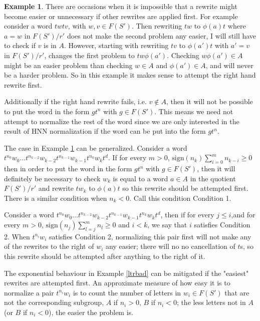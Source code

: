 \documentclass[11pt]{article} %
\theoremstyle{definition}
\theoremstyle{definition}
\theoremstyle{definition}
\theoremstyle{definition}
\theoremstyle{definition}
\theoremstyle{definition}
\newtheorem{exmpl}{Example}[theorem]
\begin{document}
\begin{exmpl}\label{lastfirst}
There are occasions when it is impossible that a rewrite might become
easier or unnecessary if other rewrites are applied first. For example
consider a word $twtv$, with $w, v \in F(S')$. Then rewriting $tw$ to
$\phi(a)t$ where $a = w$ in $F(S') / r'$ does not make the second problem
any easier, I will still have to check if $v$ is in $A$. However,
starting with rewriting $tv$ to $\phi(a')t$ with $a' = v$ in $F(S') / r'$,
changes the first problem to $tw\phi(a')$.
Checking $w\phi(a') \in A$ might be an easier problem than checking $w \in A$
and $\phi(a') \in A$, and will never be a harder problem. So in this example
it makes sense to attempt the right hand rewrite first.

Additionally if the
right hand rewrite fails, i.e. $v \notin A$, then it will not be possible to
put the word in the form $gt^n$ with $g \in F(S')$. This means we need not
attempt to normalize the rest of the word since we are only interested in the result of
HNN normalization if the word can be put into the form $gt^n$.
\end{exmpl}

The case in Example \ref{lastfirst} can be generalized.
Consider a word \newline $t^{n_0}w_0 \dots t^{n_{k-2}}w_{k-2}t^{n_{k-1}}w_{k-1}t^{n_{k}}w_{k}t^d$.
If for every $m > 0$, $\text{sign}(n_k)\sum_{i=0}^m n_{k - i} \ge 0$ then
in order to put the word in the form $gt^n$ with $g \in F(S')$, then it will definitely
be necessary to check $w_k$ is equal to a word  $a \in A$ in the quotient
$F(S') / r'$ and rewrite $tw_k$ to $\phi(a)t$ so this
rewrite should be attempted first.
There is a similar condition when $n_k < 0$. Call this condition Condition 1.

Consider a word
$t^{n_0}w_0 \dots t^{n_{k-2}}w_{k-2}t^{n_{k-1}}w_{k-1}t^{n_{k}}w_{k}t^d$,
then if for every $j \le i$,and for every $m > 0$, $\text{sign}(n_j)\sum_{l=j}^m n_l \ge 0$ and
$i < k$, we say that $i$ satisfies Condition 2.
When $t^{n_i}w_i$ satisfies Condition 2,
normalizing this pair first will not make any of the rewrites to the right
of $w_i$ any easier; there will no no cancellation of $t$s,
so this rewrite should be attempted after anything to the right of it.

The exponential behaviour in Example \ref{ltrbad} can be mitigated if the "easiest"
rewrites are attempted first. An approximate measure of how
easy it is to normalize a pair $t^{n_i}w_i$ is to count the number of letters
in $w_i \in F(S')$ that are not the corresponding subgroup, $A$ if $n_i > 0$,
$B$ if $n_i < 0$; the less letters not in $A$ (or $B$ if $n_i < 0$),
the easier the problem is.
\end{document}
